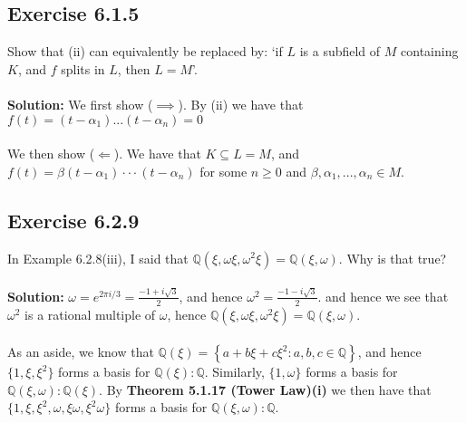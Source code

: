 \documentclass{article}
\begin{document}
\subsection*{Exercise 6.1.5}
Show that (ii) can equivalently be replaced by: `if $L$ is a subfield of $M$
containing $K$, and $f$ splits in $L$, then $L=M$'.
\\\\
\textbf{Solution:}
We first show ($\implies$). By (ii) we have that $f(t)=(t-\alpha_1)...(t-\alpha_n)=0$
\\\\
We then show ($\Longleftarrow$). We have that $K \subseteq L = M$, and $f(t)=\beta(t-\alpha_1)\cdot\cdot\cdot(t-\alpha_n)$
for some $n \ge 0$ and $\beta, \alpha_1,...,\alpha_n \in M$.

\subsection*{Exercise 6.2.9}
In Example 6.2.8(iii), I said that $\mathbb{Q}(\xi, \omega\xi, \omega^2\xi) = \mathbb{Q}(\xi,\omega)$.
Why is that true?
\\\\
\textbf{Solution:}
$\omega=e^{2\pi i /3} = \frac{-1+i\sqrt{3}}{2}$, and hence $\omega^2 = \frac{-1-i\sqrt{3}}{2}$. and hence we see that $\omega^2$ is a rational multiple
of $\omega$, hence $\mathbb{Q}(\xi, \omega\xi, \omega^2\xi) = \mathbb{Q}(\xi,\omega)$.
\\\\
As an aside, we know that $\mathbb{Q}(\xi)= \left\{a + b\xi + c\xi^2: a,b,c \in \mathbb{Q} \right\}$, and hence $\{1, \xi, \xi^2\}$
forms a basis for $\mathbb{Q}(\xi):\mathbb{Q}$. Similarly, $\{1, \omega\}$ forms a basis for $\mathbb{Q}(\xi, \omega): \mathbb{Q}(\xi)$.
By \textbf{Theorem 5.1.17 (Tower Law)(i)} we then have that $\{1, \xi, \xi^2, \omega, \xi\omega, \xi^2\omega\}$ forms a basis for $\mathbb{Q}(\xi, \omega):\mathbb{Q}$.
\end{document}
